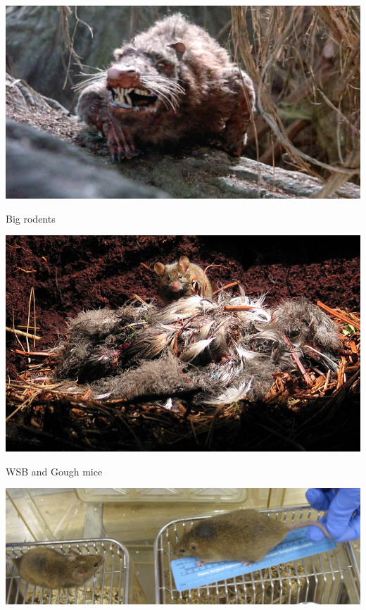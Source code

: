 \documentclass[12pt]{article}
\newcommand{\headsize}{\fontsize{35}{35} \selectfont}
\begin{document}
\vspace{10mm}

\centerline{\includegraphics[width=\textwidth]{Figs/rodents_of_unusual_size.jpg}}




\newpage

\addtocounter{page}{-1}

\headsize \color{myyellow}
\hfill \begin{minipage}{5.75in}
\centering
Big rodents
\end{minipage}

\vspace{10mm}

\centerline{\includegraphics[width=\textwidth]{Figs/gough_mouse_with_bird.jpg}}


\newpage

\headsize \color{myyellow}
\hfill \begin{minipage}{5.75in}
\centering
WSB and Gough mice
\end{minipage}

\vspace{30mm}

\centerline{\includegraphics[width=\textwidth]{Figs/wsb_508_and_gough_535_cropped.jpg}}
\end{document}

